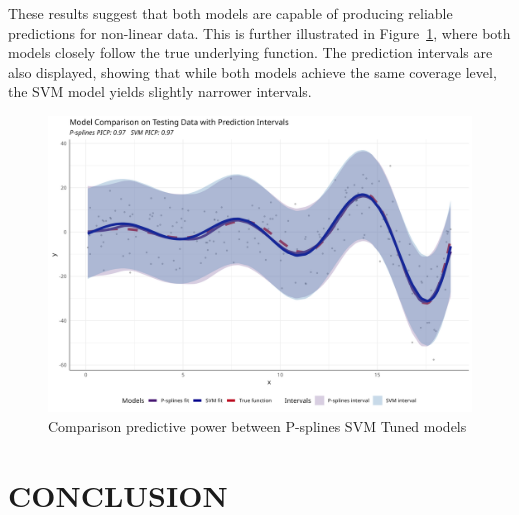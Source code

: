\documentclass[8pt,twocolumn]{article}
\begin{document}
These results suggest that both models are capable of producing reliable predictions for non-linear data. This is further illustrated in Figure~\ref{fig:prediction_comparison}, where both models closely follow the true underlying function. The prediction intervals are also displayed, showing that while both models achieve the same coverage level, the SVM model yields slightly narrower intervals.


\begin{figure}[htbp]
    \centering
    \includegraphics[width=0.8\columnwidth]{img7.png}
    \caption{Comparison predictive power between P-splines SVM Tuned models}
    \label{fig:prediction_comparison}
    \vspace{-10pt}
\end{figure}



\section{CONCLUSION}
\end{document}
